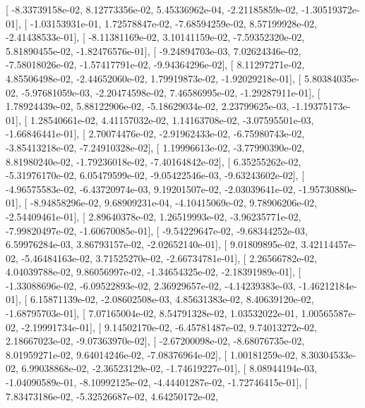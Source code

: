 \documentclass{article}
\begin{document}
       [ -8.33739158e-02,   8.12773356e-02,   5.45336962e-04,
         -2.21185859e-02,  -1.30519372e-01],
       [ -1.03153931e-01,   1.72578847e-02,  -7.68594259e-02,
          8.57199928e-02,  -2.41438533e-01],
       [ -8.11381169e-02,   3.10141159e-02,  -7.59352320e-02,
          5.81890455e-02,  -1.82476576e-01],
       [ -9.24894703e-03,   7.02624346e-02,  -7.58018026e-02,
         -1.57417791e-02,  -9.94364296e-02],
       [  8.11297271e-02,   4.85506498e-02,  -2.44652060e-02,
          1.79919873e-02,  -1.92029218e-01],
       [  5.80384035e-02,  -5.97681059e-03,  -2.20474598e-02,
          7.46586995e-02,  -1.29287911e-01],
       [  1.78924439e-02,   5.88122906e-02,  -5.18629034e-02,
          2.23799625e-03,  -1.19375173e-01],
       [  1.28540661e-02,   4.41157032e-02,   1.14163708e-02,
         -3.07595501e-03,  -1.66846441e-01],
       [  2.70074476e-02,  -2.91962433e-02,  -6.75980743e-02,
         -3.85413218e-02,  -7.24910328e-02],
       [  1.19996613e-02,  -3.77990390e-02,   8.81980240e-02,
         -1.79236018e-02,  -7.40164842e-02],
       [  6.35255262e-02,  -5.31976170e-02,   6.05479599e-02,
         -9.05422546e-03,  -9.63243602e-02],
       [ -4.96575583e-02,  -6.43720974e-03,   9.19201507e-02,
         -2.03039641e-02,  -1.95730880e-01],
       [ -8.94858296e-02,   9.68909231e-04,  -4.10415069e-02,
          9.78906206e-02,  -2.54409461e-01],
       [  2.89640378e-02,   1.26519993e-02,  -3.96235771e-02,
         -7.99820497e-02,  -1.60670085e-01],
       [ -9.54229647e-02,  -9.68344252e-03,   6.59976284e-03,
          3.86793157e-02,  -2.02652140e-01],
       [  9.01809895e-02,   3.42114457e-02,  -5.46484163e-02,
          3.71525270e-02,  -2.66734781e-01],
       [  2.26566782e-02,   4.04039788e-02,   9.86056997e-02,
         -1.34654325e-02,  -2.18391989e-01],
       [ -1.33088696e-02,  -6.09522893e-02,   2.36929657e-02,
         -4.14239383e-03,  -1.46212184e-01],
       [  6.15871139e-02,  -2.08602508e-03,   4.85631383e-02,
          8.40639120e-02,  -1.68795703e-01],
       [  7.07165004e-02,   8.54791328e-02,   1.03532022e-01,
          1.00565587e-02,  -2.19991734e-01],
       [  9.14502170e-02,  -6.45781487e-02,   9.74013272e-02,
          2.18667023e-02,  -9.07363970e-02],
       [ -2.67200098e-02,  -8.68076735e-02,   8.01959271e-02,
          9.64014246e-02,  -7.08376964e-02],
       [  1.00181259e-02,   8.30304533e-02,   6.99038868e-02,
         -2.36523129e-02,  -1.74619227e-01],
       [  8.08944194e-03,  -1.04090589e-01,  -8.10992125e-02,
         -4.44401287e-02,  -1.72746415e-01],
       [  7.83473186e-02,  -5.32526687e-02,   4.64250172e-02,
\end{document}

